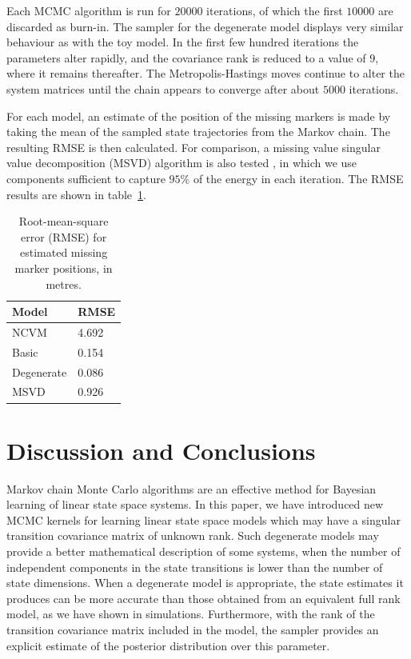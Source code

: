 \documentclass[journal,10pt]{IEEEtran}
\begin{document}
Each MCMC algorithm is run for $20000$ iterations, of which the first $10000$ are discarded as burn-in. The sampler for the degenerate model displays very similar behaviour as with the toy model. In the first few hundred iterations the parameters alter rapidly, and the covariance rank is reduced to a value of $9$, where it remains thereafter. The Metropolis-Hastings moves continue to alter the system matrices until the chain appears to converge after about $5000$ iterations.

For each model, an estimate of the position of the missing markers is made by taking the mean of the sampled state trajectories from the Markov chain. The resulting RMSE is then calculated. For comparison, a missing value singular value decomposition (MSVD) algorithm is also tested \cite{Srebro2003,Liu2006,Li2009}, in which we use components sufficient to capture $95\%$ of the energy in each iteration. The RMSE results are shown in table~\ref{tab:mocap-rmse}.

\begin{table}
 \centering
 \begin{tabular}{l|l}
  Model          & RMSE \\
  \hline
  NCVM           & 4.692 \\
  Basic          & 0.154 \\
  Degenerate     & 0.086 \\
  MSVD           & 0.926
 \end{tabular}
 \caption{Root-mean-square error (RMSE) for estimated missing marker positions, in metres.}
 \label{tab:mocap-rmse}
\end{table}



\section{Discussion and Conclusions} \label{sec:conclusions}

Markov chain Monte Carlo algorithms are an effective method for Bayesian learning of linear state space systems. In this paper, we have introduced new MCMC kernels for learning linear state space models which may have a singular transition covariance matrix of unknown rank. Such degenerate models may provide a better mathematical description of some systems, when the number of independent components in the state transitions is lower than the number of state dimensions. When a degenerate model is appropriate, the state estimates it produces can be more accurate than those obtained from an equivalent full rank model, as we have shown in simulations. Furthermore, with the rank of the transition covariance matrix included in the model, the sampler provides an explicit estimate of the posterior distribution over this parameter.
\end{document}
